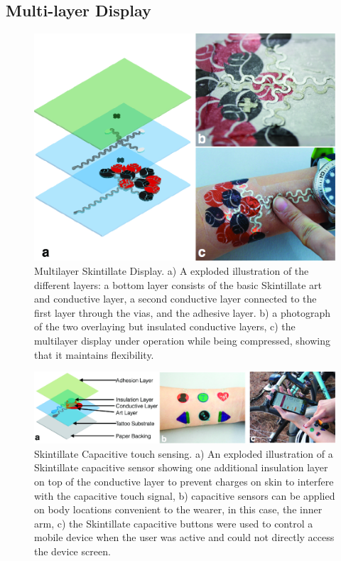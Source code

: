 \documentclass{sigchi}
\begin{document}
\subsection{Multi-layer Display}
\begin{figure}
\centering
\includegraphics[width=1\columnwidth]{figures/Figure7}
\caption{Multilayer Skintillate Display. a) A exploded illustration of the different layers: a bottom layer consists of the basic Skintillate art and conductive layer, a second conductive layer connected to the first layer through the vias, and the adhesive layer. b) a photograph of the two overlaying but insulated conductive layers, c) the multilayer display under operation while being compressed, showing that it maintains flexibility.}
\vspace{-8pt}
\label{fig:multilayer}
\end{figure}
\begin{figure}
\centering
\includegraphics[width=1\textwidth]{figures/Figure8}
\caption{Skintillate Capacitive touch sensing. a) An exploded illustration of a Skintillate capacitive sensor showing one additional insulation layer on top of the conductive layer to prevent charges on skin to interfere with the capacitive touch signal, b) capacitive sensors can be applied on body locations convenient to the wearer, in this case, the inner arm, c) the Skintillate capacitive buttons were used to control a mobile device when the user was active and could not directly access the device screen.}
\vspace{-8pt}
\label{fig:capacitive}
\end{figure}
\end{document}
